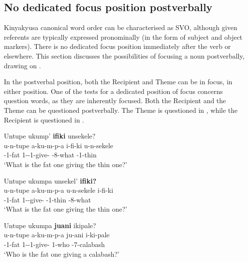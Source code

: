 \documentclass[output=paper]{langscibook}
\begin{document}
\subsection{No dedicated focus position postverbally}
\label{bkm:Ref125381586}
Kinyakyusa canonical word order can be characterised as SVO, although given referents are typically expressed pronominally (in the form of subject and object markers). There is no dedicated focus position immediately after the verb or elsewhere. This section discusses the possibilities of focusing a noun postverbally, drawing on \citet{KerrEtAl2023}. 

In the postverbal position, both the Recipient and Theme can be in focus, in either position. One of the tests for a dedicated position of focus concerns question words, as they are inherently focused. Both the Recipient and the Theme can be questioned postverbally. The Theme is questioned in , while the Recipient is questioned in .

\ea
\label{bkm:Ref136343831}
\ea
\label{bkm:Ref136343831:a}
Untupe ukump’ \textbf{ifiki} unsekele?\\
\gll
u-n-tupe  a-ku-m-p-a  i-fi-ki  u-n-sekele\\
\AUG{}-1-fat  1\SM{}-\PRS{}-1\OM{}-give-\FV{}  \AUG{}-8-what  \AUG{}-1-thin\\
\glt ‘What is the fat one giving the thin one?'

\ex
\label{bkm:Ref136343831:b}
{Untupe} {ukumpa} {unsekel’} \textbf{ifiki?}\\
\gll
{u-n-tupe}  {a-ku-m-p-a}  {u-n-sekele}  i-fi-ki\\
{\AUG{}-1-fat}  {1\SM-\OM{}-give-\FV{}}  {\AUG{}-1-thin}  {\AUG{}-8-what}\\
\glt
‘What is the fat one giving the thin one?’\\

\z

\ex\label{ex:postv-qrecipient}
\ea
\label{ex:postv-qrecipient:a}
Untupe ukumpa \textbf{juani} ikipale?\\
\gll
u-n-tupe  a-ku-m-p-a  ju-ani  i-ki-pale\\
\AUG{}-1-fat  1\SM{}-\PRS{}-1\OM{}-give-\FV{}  1-who  \AUG{}-7-calabash\\
\glt
‘Who is the fat one giving a calabash?’\\
\end{document}
